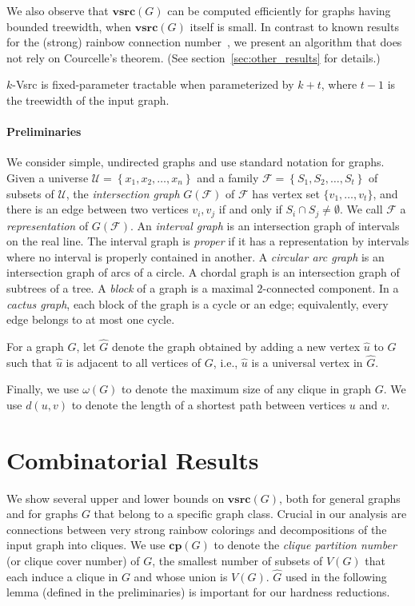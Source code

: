 \documentclass[letter,runningheads,envcountsame,envcountsect]{llncs}
\newcommand{\U}{\mathcal{U}}
\newcommand{\F}{\mathcal{F}}
\newcommand{\vsrc}{\mathbf{vsrc}}
\newcommand{\kvsrc}{{\sc $k$-Vsrc}}
\newcommand{\cp}{\mathbf{cp}}
\begin{document}
We also observe that $\vsrc(G)$ can be computed efficiently for graphs having bounded treewidth, when $\vsrc(G)$ itself is small. In contrast to known results for the (strong) rainbow connection number~\cite{eiben2016complexity}, we present an algorithm that does not rely on Courcelle's theorem. (See section~\ref{sec:other_results} for details.)

\begin{theorem} \label{fpt-kt}
{\kvsrc} is fixed-parameter tractable when parameterized by $k+t$, where $t-1$ is the treewidth of the input graph.
\end{theorem}

\paragraph{Preliminaries}
We consider simple, undirected graphs and use standard notation for graphs. Given a universe $\U=\left\{ x_1,x_2,\dots, x_n \right\}$ and a family $\F=\left\{ S_1,S_2,\dots,S_t \right\}$ of subsets of $\U$, the \emph{intersection graph} $G(\F)$ of $\F$ has vertex set $\{v_1,\ldots,v_t\}$, and there is an edge between two vertices $v_i,v_j$ if and only if $S_i \cap S_j \not= \emptyset$. We call $\F$ a \emph{representation} of $G(\F)$. An \emph{interval graph} is an intersection graph of intervals on the real line. The interval graph is \emph{proper} if it has a representation by intervals where no interval is properly contained in another. A \emph{circular arc graph} is an intersection graph of arcs of a circle. A chordal graph is an intersection graph of subtrees of a tree.
%
A \emph{block} of a graph is a maximal $2$-connected component. 
In a \emph{cactus graph}, each block of the graph is a cycle or an edge; equivalently, every edge belongs to at most one cycle.

For a graph $G$, let $\hat{G}$ denote the graph obtained by adding a new vertex $\hat{u}$ to $G$ such that $\hat{u}$ is adjacent to all vertices of $G$, i.e., $\hat{u}$ is a universal vertex in $\hat{G}$. 

Finally, we use $\omega(G)$ to denote the maximum size of any clique in graph $G$. We use $d(u,v)$ to denote the length of a shortest path between vertices $u$ and $v$.


\section{Combinatorial Results} \label{sec:combinatorial}
We show several upper and lower bounds on $\vsrc(G)$, both for general graphs and for graphs $G$ that belong to a specific graph class. Crucial in our analysis are connections between very strong rainbow colorings and decompositions of the input graph into cliques.
%
We use $\cp(G)$ to denote the \emph{clique partition number} (or clique cover number) of $G$, the smallest number of subsets of $V(G)$ that each induce a clique in $G$ and whose union is $V(G)$.
$\hat{G}$ used in the following lemma (defined in the preliminaries) is important for our hardness reductions.
\end{document}
